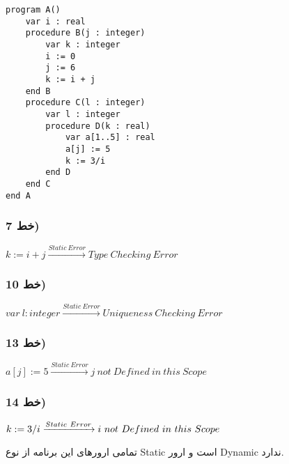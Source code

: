 \setLTR
\begin{lstlisting}
program A()
    var i : real
    procedure B(j : integer)
        var k : integer
        i := 0
        j := 6
        k := i + j
    end B
    procedure C(l : integer)
        var l : integer
        procedure D(k : real)
            var a[1..5] : real
            a[j] := 5
            k := 3/i
        end D
    end C
end A
\end{lstlisting}
\setRTL

\subsubsection*{خط 7)} 
\setLTR
$
k:=i+j \xrightarrow{Static \ Error} Type \ Checking \ Error
$
\setRTL
\subsubsection*{خط 10)}
\setLTR
$
var \ l:integer \xrightarrow{Static \ Error} Uniqueness \ Checking \ Error
$
\setRTL
\subsubsection*{خط 13)}
\setLTR
$
a[j]:=5 \xrightarrow{Static \ Error} j \ not \ Defined  \ in \ this \ Scope
$
\setRTL
\subsubsection*{خط 14)}
\setLTR
$
k:=3/i \xrightarrow{Static \ Error} i \ not \ Defined  \ in \ this \ Scope \\ \\
$
\setRTL

تمامی ارورهای این برنامه از نوع Static است و ارور Dynamic ندارد.


